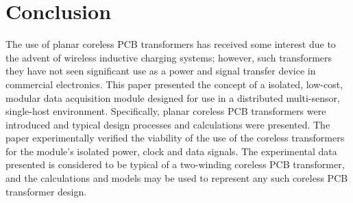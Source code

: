 \documentclass[conference]{IEEEtran}
\begin{document}
\section{Conclusion}
The use of planar coreless PCB transformers has received some interest due to the advent of wireless inductive charging systems; however, such transformers they have not seen significant use as a power and signal transfer device in commercial electronics.  This paper presented the concept of a isolated, low-cost, modular data acquisition module designed for use in a distributed multi-sensor, single-host environment.  Specifically, planar coreless PCB transformers were introduced and typical design processes and calculations were presented.  The paper experimentally verified the viability of the use of the coreless transformers for the module's isolated power, clock and data signals.  The experimental data presented is considered to be typical of a two-winding coreless PCB transformer, and the calculations and models may be used to represent any such coreless PCB transformer design.  







\end{document}

